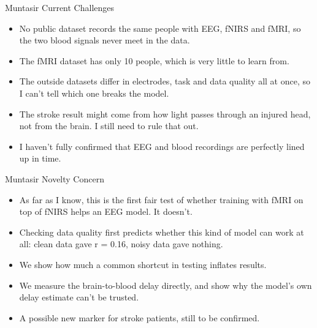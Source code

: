 \documentclass[aspectratio=169,11pt]{beamer}
\begin{document}
\begin{frame}{Muntasir Current Challenges}
\begin{slidebox}
\begin{itemize}\setlength{\itemsep}{5pt}
  \item No public dataset records the same people with EEG, fNIRS and fMRI, so the two blood signals never meet in the data.
  \item The fMRI dataset has only 10 people, which is very little to learn from.
  \item The outside datasets differ in electrodes, task and data quality all at once, so I can't tell which one breaks the model.
  \item The stroke result might come from how light passes through an injured head, not from the brain. I still need to rule that out.
  \item I haven't fully confirmed that EEG and blood recordings are perfectly lined up in time.
\end{itemize}
\end{slidebox}
\end{frame}

\begin{frame}{Muntasir Novelty Concern}
\begin{slidebox}
\begin{itemize}\setlength{\itemsep}{5pt}
  \item As far as I know, this is the first fair test of whether training with fMRI on top of fNIRS helps an EEG model. It doesn't.
  \item Checking data quality first predicts whether this kind of model can work at all: clean data gave r = 0.16, noisy data gave nothing.
  \item We show how much a common shortcut in testing inflates results.
  \item We measure the brain-to-blood delay directly, and show why the model's own delay estimate can't be trusted.
  \item A possible new marker for stroke patients, still to be confirmed.
\end{itemize}
\end{slidebox}
\end{frame}
\end{document}

